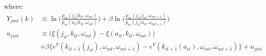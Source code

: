 \documentclass[11pt]{article}
\begin{document}
where:
\begin{align}
Y_{jmt}(k) &\equiv \ln\bigg(\frac{p_m(j_{it}|k_{it},\omega_{mt})}{p_m(a_{it}|k_{it},\omega_{mt})}\bigg) + \beta\ln\bigg(\frac{p_m(j_{it}|j_{it},\omega_{mt+1})}{p_m(j_{it}|a_{it},\omega_{mt+1})}\bigg) \\
u_{jmt} &\equiv \Big(\xi(j_{it},k_{it},\omega_{mt}) - \xi(a_{it},k_{it},\omega_{mt})\Big) \\
& + \beta \Big\{e^V(k_{it+1}(j_{it}),\omega_{mt},\omega_{mt+1}) -  e^V(k_{it+1}(a_{it}),\omega_{mt},\omega_{mt+1})\Big\} + u_{jmt} \nonumber 
\end{align}

%
%
%
%




\end{document}
